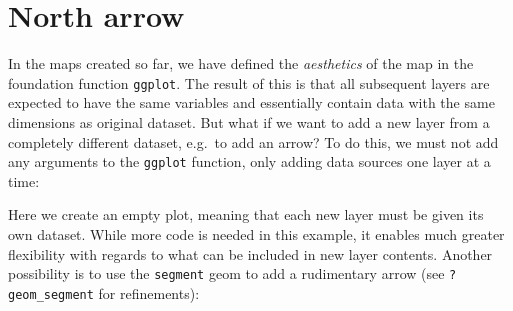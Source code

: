 \documentclass[]{article}
\begin{document}
\section{North arrow}

In the maps created so far, we have defined the \emph{aesthetics} of the
map in the foundation function \texttt{ggplot}. The result of this is
that all subsequent layers are expected to have the same variables and
essentially contain data with the same dimensions as original dataset.
But what if we want to add a new layer from a completely different
dataset, e.g.~to add an arrow? To do this, we must not add any arguments
to the \texttt{ggplot} function, only adding data sources one layer at a
time:

Here we create an empty plot, meaning that each new layer must be given
its own dataset. While more code is needed in this example, it enables
much greater flexibility with regards to what can be included in new
layer contents. Another possibility is to use the \texttt{segment} geom
to add a rudimentary arrow (see \texttt{?geom\_segment} for
refinements):
\end{document}
